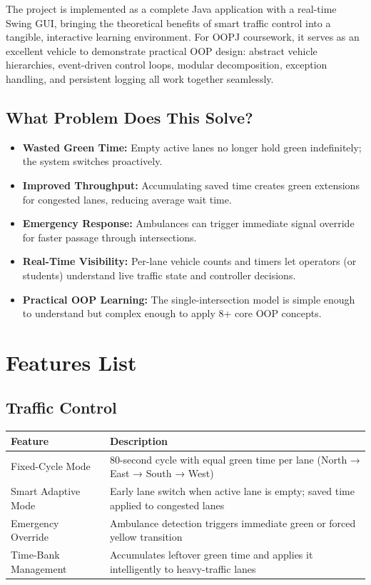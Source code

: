 \documentclass[12pt,a4paper]{article}
\begin{document}
The project is implemented as a complete Java application with a real-time Swing GUI, bringing the theoretical benefits of smart traffic control into a tangible, interactive learning environment. For OOPJ coursework, it serves as an excellent vehicle to demonstrate practical OOP design: abstract vehicle hierarchies, event-driven control loops, modular decomposition, exception handling, and persistent logging all work together seamlessly.

\subsection{What Problem Does This Solve?}
\begin{itemize}
    \item \textbf{Wasted Green Time:} Empty active lanes no longer hold green indefinitely; the system switches proactively.
    \item \textbf{Improved Throughput:} Accumulating saved time creates green extensions for congested lanes, reducing average wait time.
    \item \textbf{Emergency Response:} Ambulances can trigger immediate signal override for faster passage through intersections.
    \item \textbf{Real-Time Visibility:} Per-lane vehicle counts and timers let operators (or students) understand live traffic state and controller decisions.
    \item \textbf{Practical OOP Learning:} The single-intersection model is simple enough to understand but complex enough to apply 8+ core OOP concepts.
\end{itemize}

\section{Features List}

\subsection{Traffic Control}
\begin{table}[h]
    \centering
    \begin{tabularx}{\textwidth}{|l|X|}
        \hline
        \textbf{Feature} & \textbf{Description} \\ \hline
        Fixed-Cycle Mode & 80-second cycle with equal green time per lane (North → East → South → West) \\ \hline
        Smart Adaptive Mode & Early lane switch when active lane is empty; saved time applied to congested lanes \\ \hline
        Emergency Override & Ambulance detection triggers immediate green or forced yellow transition \\ \hline
        Time-Bank Management & Accumulates leftover green time and applies it intelligently to heavy-traffic lanes \\ \hline
    \end{tabularx}
\end{table}
\end{document}
